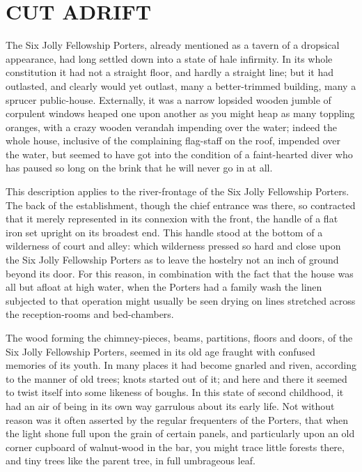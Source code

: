 
\chapter{CUT ADRIFT}

The Six Jolly Fellowship Porters, already mentioned as a tavern of
a dropsical appearance, had long settled down into a state of hale
infirmity. In its whole constitution it had not a straight floor, and
hardly a straight line; but it had outlasted, and clearly would yet
outlast, many a better-trimmed building, many a sprucer public-house.
Externally, it was a narrow lopsided wooden jumble of corpulent windows
heaped one upon another as you might heap as many toppling oranges,
with a crazy wooden verandah impending over the water; indeed the whole
house, inclusive of the complaining flag-staff on the roof, impended
over the water, but seemed to have got into the condition of a
faint-hearted diver who has paused so long on the brink that he will
never go in at all.

This description applies to the river-frontage of the Six Jolly
Fellowship Porters. The back of the establishment, though the chief
entrance was there, so contracted that it merely represented in its
connexion with the front, the handle of a flat iron set upright on its
broadest end. This handle stood at the bottom of a wilderness of court
and alley: which wilderness pressed so hard and close upon the Six Jolly
Fellowship Porters as to leave the hostelry not an inch of ground beyond
its door. For this reason, in combination with the fact that the house
was all but afloat at high water, when the Porters had a family wash the
linen subjected to that operation might usually be seen drying on lines
stretched across the reception-rooms and bed-chambers.

The wood forming the chimney-pieces, beams, partitions, floors and
doors, of the Six Jolly Fellowship Porters, seemed in its old age
fraught with confused memories of its youth. In many places it had
become gnarled and riven, according to the manner of old trees; knots
started out of it; and here and there it seemed to twist itself into
some likeness of boughs. In this state of second childhood, it had an
air of being in its own way garrulous about its early life. Not without
reason was it often asserted by the regular frequenters of the Porters,
that when the light shone full upon the grain of certain panels, and
particularly upon an old corner cupboard of walnut-wood in the bar, you
might trace little forests there, and tiny trees like the parent tree,
in full umbrageous leaf.

